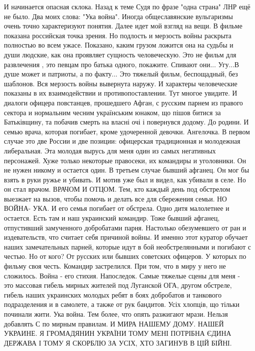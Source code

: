 И начинается опасная склока.
Назад к теме Судя по фразе "одна страна" ЛНР ещё не было. Два моих слова: "Ука
война". Иногда общеславянские вульгаризмы очень точно характеризуют понятия.
Далее идет мой взгляд на вещи. В фильме показана российская точка зрения. Но
подлость и мерзость войны раскрыта полностью во всем ужасе. Показано, каким
грузом ложится она на судьбы и души людские, как она проявляет сущность
человеческую. Это не фильм для развлечения , это певцам про батька одного,
покажите. Спивают они... Угу...В душе может и патриоты, а по факту... Это
тяжелый фильм, беспощадный, без шаблонов. Вся мерзость войны вывернута наружу.
И характеры человеческие показаны в их взаимодействии и противопоставлении.
Тут многое увидите. И диалоги офицера повстанцев, прошедшего Афган, с русским
парнем из правого сектора и нормальним чесним українським юнаком, що пішов
битися за Батьківщину, та побачив смерть на власні очі і повернувся додому. До
родини. И семью врача, которая погибает, кроме удочеренной девочки. Ангелочка.
В первом случае это две России и две позиции: офицерская традиционная и
молодежная либеральная. Эта молодая вырусь для меня один из самых негативных
персонажей. Хуже только некоторые правосеки, их командиры и уголовники. Он не
нужен никому и остается один. В третьем случае бывший афганец. Он мог бы взять
в руки ружье и убивать. И мотив уже был и видел, как убивали в селе. Но он стал
врачом. ВРАЧОМ И ОТЦОМ. Тем, кто каждый день под обстрелом выезжает на вызов,
чтобы помочь и делать все для сбережения семьи. НО ВОЙНА- УКА. И его семья
погибает от обстрела. Одно дитя малолетнее и остается. Есть там и наш
украинский командир. Тоже бывший афганец, отпустивший замученного добробатами
парня. Настолько обезумевшего от ран и издевательств, что считает себя причиной
войны. И именно этот куратор обучает наших замечательных парней, которые идут в
бой необстрелянными и погибают с честью. Но от  кого? От русских или бывших
советских офицеров. У которых по фильму своя честь. Командир застрелился. При
том, что в миру у него не сложилось. Война - его стихия. Напоследок. Самые
тяжелые сцены для меня - это массовая гибель мирных жителей под Луганской ОГА,
другом обстреле, гибель наших украинских молодых ребят в боях добробатов и
танкового подразделения и  в самолете, а также от рук бандитов. Усіх хлопців,
що тільки починали  жити. Ука война. Тем более, что опять разжигают мрази.
Нельзя добавлять С по мирным правилам. И МИРА НАШЕМУ ДОМУ. НАШЕЙ УКРАИНЕ. Я
ГРОМАДЯНИН УКРАЇНИ ТОМУ МЕНІ ПОТРІБНА ЄДИНА ДЕРЖАВА І ТОМУ Я СКОРБЛЮ ЗА УСІХ,
ХТО ЗАГИНУВ В ЦІЙ БІЙНІ.  
